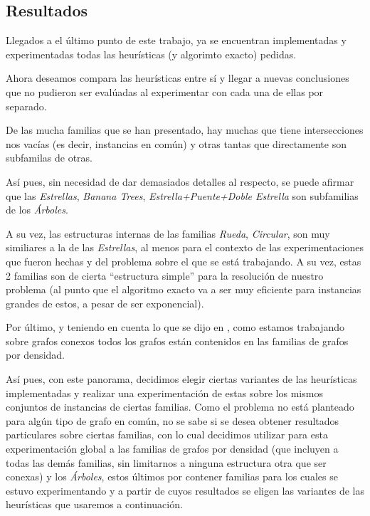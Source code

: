 \subsection{Resultados}
\par Llegados a el \'ultimo punto de este trabajo, ya se encuentran implementadas
    y experimentadas todas las heur\'isticas (y algorimto exacto) pedidas.

\par Ahora deseamos compara las heur\'isticas entre s\'i y llegar a nuevas
    conclusiones que no pudieron ser eval\'uadas al experimentar con cada
    una de ellas por separado.

\par De las mucha familias que se han presentado, hay muchas que tiene intersecciones
    nos vac\'ias (es decir, instancias en com\'un) y otras tantas que directamente
    son subfamilas de otras.

\par As\'i pues, sin necesidad de dar demasiados detalles al respecto, se
    puede afirmar que las \emph{Estrellas}, \emph{Banana Trees},
    \emph{Estrella+Puente+Doble Estrella} son subfamilias de los \emph{\'Arboles}.

\par A su vez, las estructuras internas de las familias \emph{Rueda}, \emph{Circular},
    son muy similiares a la de las \emph{Estrellas}, al menos para el contexto
    de las experimentaciones que fueron hechas y del problema sobre el que se est\'a
    trabajando. A su vez, estas 2 familias son de cierta ``estructura simple'' para
    la resoluci\'on de nuestro problema (al punto que el algoritmo exacto va a ser
    muy eficiente para instancias grandes de estos, a pesar de ser exponencial).

\par Por \'ultimo, y teniendo en cuenta lo que se dijo en \emph{},
    como estamos trabajando sobre grafos conexos todos los grafos est\'an
    contenidos en las familias de grafos por densidad.

\par As\'i pues, con este panorama, decidimos elegir ciertas variantes de las
    heur\'isticas implementadas y realizar una experimentaci\'on de estas sobre
    los mismos conjuntos de instancias de ciertas familias. Como el problema
    no est\'a planteado para alg\'un tipo de grafo en com\'un, no se sabe
    si se desea obtener resultados particulares sobre ciertas familias, con
    lo cual decidimos utilizar para esta experimentaci\'on global a las familias
    de grafos por densidad (que incluyen a todas las dem\'as familias, sin limitarnos
    a ninguna estructura otra que ser conexas) y los \emph{\'Arboles}, estos \'ultimos
    por contener familias para los cuales se estuvo experimentando y a partir de
    cuyos resultados se eligen las variantes de las heur\'isticas que usaremos
    a continuaci\'on.

